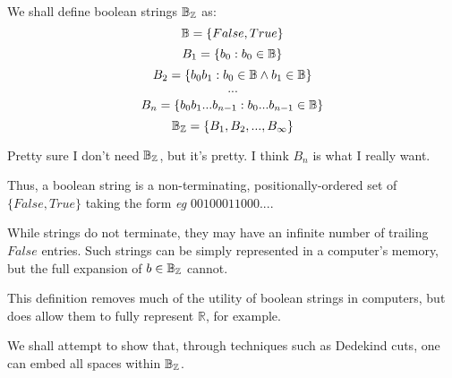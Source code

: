 \documentclass{article}
\begin{document}

We shall define boolean strings $\mathbb{B}_\mathbb{Z}$ as:
\[\mathbb{B} = \{False, True\}\]
\[B_1 = \{b_0 : b_0 \in \mathbb{B}\}\]
\[B_2 = \{b_0 b_1 : b_0 \in \mathbb{B} \wedge b_1 \in \mathbb{B}\}\]
\[...\]
\[B_n = \{b_0 b_1 ... b_{n-1} : b_0 ... b_{n-1} \in \mathbb{B}\}\]
\[\mathbb{B}_\mathbb{Z} = \{B_1, B_2, ..., B_\infty\}\]

Pretty sure I don't need $\mathbb{B}_\mathbb{Z}$, but it's pretty. I think $B_n$ is what I really want.

Thus, a boolean string is a non-terminating, positionally-ordered
set of $\{False, True\}$ taking the form \textit{eg} $00100011000....$

While strings do not terminate, they may have an infinite number of trailing $False$ entries.
Such strings can be simply represented in a computer's memory, but the full expansion of $b \in \mathbb{B}_\mathbb{Z}$ cannot.

This definition removes much of the utility of boolean strings in computers, but does allow them to fully represent $\mathbb{R}$, for example.

We shall attempt to show that, through techniques such as Dedekind cuts, one can embed all spaces within $\mathbb{B}_\mathbb{Z}$.
\end{document}
